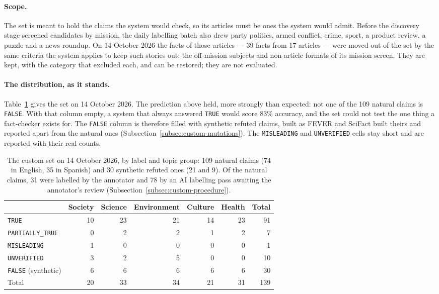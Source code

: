 \paragraph{Scope.} The set is meant to hold the claims the system
would check, so its articles must be ones the system would admit.
Before the discovery stage screened candidates by mission, the daily
labelling batch also drew party politics, armed conflict, crime,
sport, a product review, a puzzle and a news roundup. On 14 October
2026 the facts of those articles --- 39 facts from 17 articles --- were
moved out of the set by the same criteria the system applies to keep
such stories out: the off-mission subjects and non-article formats of
its mission screen. They are kept, with the category that excluded
each, and can be restored; they are not evaluated.

\paragraph{The distribution, as it stands.} Table~\ref{tab:custom-matrix}
gives the set on 14 October 2026. The prediction above held, more
strongly than expected: not one of the 109 natural claims is
\texttt{FALSE}. With that column empty, a system that always answered
\texttt{TRUE} would score 83\% accuracy, and the set could not test
the one thing a fact-checker exists for. The \texttt{FALSE} column is
therefore filled with synthetic refuted claims, built as FEVER and
SciFact built theirs and reported apart from the natural ones
(Subsection~\ref{subsec:custom-mutations}). The
\texttt{MISLEADING} and \texttt{UNVERIFIED} cells stay short and are
reported with their real counts.

\begin{table}[ht]
\centering
\small
\begin{tabular}{@{}lrrrrrr@{}}
\toprule
& \textbf{Society} & \textbf{Science} & \textbf{Environment} &
\textbf{Culture} & \textbf{Health} & \textbf{Total} \\
\midrule
\texttt{TRUE}            & 10 & 23 & 21 & 14 & 23 & 91 \\
\texttt{PARTIALLY\_TRUE} &  0 &  2 &  2 &  1 &  2 &  7 \\
\texttt{MISLEADING}      &  1 &  0 &  0 &  0 &  0 &  1 \\
\texttt{UNVERIFIED}      &  3 &  2 &  5 &  0 &  0 & 10 \\
\texttt{FALSE} (synthetic) & 6 &  6 &  6 &  6 &  6 & 30 \\
\midrule
Total                    & 20 & 33 & 34 & 21 & 31 & 139 \\
\bottomrule
\end{tabular}
\caption{The custom set on 14 October 2026, by label and topic group:
109 natural claims (74 in English, 35 in Spanish) and 30 synthetic
refuted ones (21 and 9). Of the natural claims, 31 were labelled by
the annotator and 78 by an AI labelling pass awaiting the annotator's
review (Subsection~\ref{subsec:custom-procedure}).}
\label{tab:custom-matrix}
\end{table}
